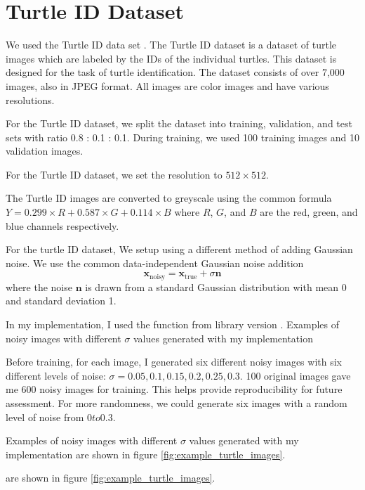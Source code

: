 \documentclass[12pt]{article}
\begin{document}
\section{Turtle ID Dataset}

We used the Turtle ID data set \cite{Adam_2024_WACV}.
The Turtle ID dataset is a dataset of turtle images which are labeled by the IDs of the individual turtles.
This dataset is designed for the task of turtle identification.
The dataset consists of over 7,000 images, also in JPEG format.
All images are color images and have various resolutions.

For the Turtle ID dataset, we split the dataset into training, validation, and test sets with ratio 0.8 : 0.1 : 0.1.
During training, we used 100 training images and 10 validation images.

For the Turtle ID dataset, we set the resolution to $512 \times 512$.

The Turtle ID images are converted to greyscale using the common formula $Y = 0.299 \times R + 0.587 \times G + 0.114 \times B$ where $R$, $G$, and $B$ are the red, green, and blue channels respectively.

For the turtle ID dataset, We setup using a different method of adding Gaussian noise. We use the common data-independent Gaussian noise addition
\begin{equation}
    \mathbf{x}_{\text{noisy}} = \mathbf{x}_{\text{true}} + \sigma \mathbf{n}
\end{equation}
where the noise $\mathbf{n}$ is drawn from a standard Gaussian distribution with mean 0 and standard deviation 1.

In my implementation, I used the  function from  library version .
Examples of noisy images with different $\sigma$ values generated with my implementation 

Before training, for each image, I generated six different noisy images with six different levels of noise: $\sigma = 0.05, 0.1, 0.15, 0.2, 0.25, 0.3$.
100 original images gave me 600 noisy images for training.
This helps provide reproducibility for future assessment.
For more randomness, we could generate six images with a random level of noise from $0 to 0.3$.


Examples of noisy images with different $\sigma$ values generated with my implementation 
are shown in figure \ref{fig:example_turtle_images}.



are shown in figure \ref{fig:example_turtle_images}.
\end{document}
